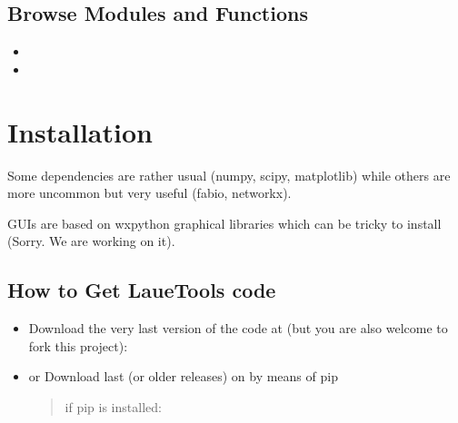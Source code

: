 \documentclass[letterpaper,10pt,english]{sphinxmanual}
\begin{document}
\section{Browse Modules and Functions}
\label{\detokenize{intro:browse-modules-and-functions}}\begin{itemize}
\item {} 

\item {} 

\end{itemize}


\chapter{Installation}
\label{\detokenize{installation::doc}}\label{\detokenize{installation:installation}}\label{\detokenize{installation:id1}}
Some dependencies are rather usual (numpy, scipy, matplotlib) while others are more uncommon but very useful (fabio, networkx).

GUIs are based on wxpython graphical libraries which can be tricky to install (Sorry. We are working on it).


\section{How to Get LaueTools code}
\label{\detokenize{installation:how-to-get-lauetools-code}}\begin{itemize}
\item {} 
Download the very last version of the code at  (but you are also welcome to fork this project):
\begin{quote}

\end{quote}

\item {} 
or Download last (or older releases) on  by means of pip
\begin{quote}


if pip is installed:

%
\begin{sphinxVerbatim}[commandchars=\\\{\}]
  
\end{sphinxVerbatim}
\end{quote}

\end{itemize}
\end{document}
